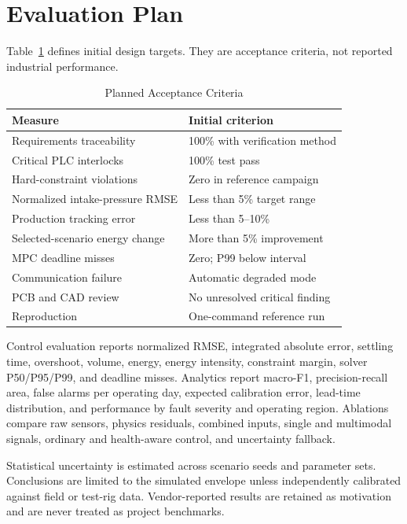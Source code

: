 \documentclass[conference]{IEEEtran}
\begin{document}
\section{Evaluation Plan}
Table~\ref{tab:criteria} defines initial design targets. They are acceptance criteria, not reported industrial performance.

\begin{table}[t]
\caption{Planned Acceptance Criteria}
\label{tab:criteria}
\centering
\footnotesize
\begin{tabular}{p{}p{}}
\toprule
Measure & Initial criterion \\
\midrule
Requirements traceability & 100\% with verification method \\
Critical PLC interlocks & 100\% test pass \\
Hard-constraint violations & Zero in reference campaign \\
Normalized intake-pressure RMSE & Less than 5\% target range \\
Production tracking error & Less than 5--10\% \\
Selected-scenario energy change & More than 5\% improvement \\
MPC deadline misses & Zero; P99 below interval \\
Communication failure & Automatic degraded mode \\
PCB and CAD review & No unresolved critical finding \\
Reproduction & One-command reference run \\
\bottomrule
\end{tabular}
\end{table}

Control evaluation reports normalized RMSE, integrated absolute error, settling time, overshoot, volume, energy, energy intensity, constraint margin, solver P50/P95/P99, and deadline misses. Analytics report macro-F1, precision-recall area, false alarms per operating day, expected calibration error, lead-time distribution, and performance by fault severity and operating region. Ablations compare raw sensors, physics residuals, combined inputs, single and multimodal signals, ordinary and health-aware control, and uncertainty fallback.

Statistical uncertainty is estimated across scenario seeds and parameter sets. Conclusions are limited to the simulated envelope unless independently calibrated against field or test-rig data. Vendor-reported results are retained as motivation and are never treated as project benchmarks.
\end{document}

